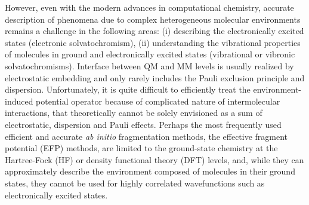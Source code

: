 \documentclass[aip,amsmath,amssymb,reprint,floatfix]{revtex4-1}
\begin{document}
However, even with the modern advances in computational chemistry, 
accurate description of phenomena due to complex heterogeneous molecular environments 
remains a challenge in the following areas: (i) describing the electronically excited states 
(electronic solvatochromism),\cite{Barbati.JACS.2014,
Szabla.Sponer.Jiri.Gora.JPCL.2015,
Bednarska.Zalesny.Tian.Murugan.Agren.Bartkowiak.Molecules.2017,
Jedrzejewska.Grabarz.Bartkowiak.Osmialowski.SpectChimActA.2018} 
(ii) understanding the vibrational properties of molecules in ground and electronically excited states
(vibrational or vibronic solvatochromisms).\cite{Blasiak.Londergan.Webb.Cho.ACR.2017} 
Interface between QM and MM levels is usually realized by electrostatic embedding
and only rarely includes the Pauli exclusion principle and dispersion.\cite{List.Olsen.Kongsted.PCCP.2016}
Unfortunately, it is quite difficult to efficiently treat the environment\hyp{}induced potential operator
because of complicated nature of intermolecular interactions, that theoretically
cannot be solely envisioned as a sum of electrostatic, dispersion and Pauli effects.
Perhaps the most frequently used efficient and accurate \emph{ab initio} fragmentation methods,
the effective fragment potential (EFP) methods, are limited to the ground\hyp{}state
chemistry at the Hartree\hyp{}Fock (HF)\cite{Gordon.Smith.Xu.Slipchenko.AnnuRevPhysChem.2013} 
or density functional theory (DFT) levels\cite{Nguyen.Pachter.Day.JCP.2014},
and, while they can approximately describe the environment composed of molecules in their ground states,
they cannot be used for highly correlated wavefunctions such as electronically excited states.
\end{document}
